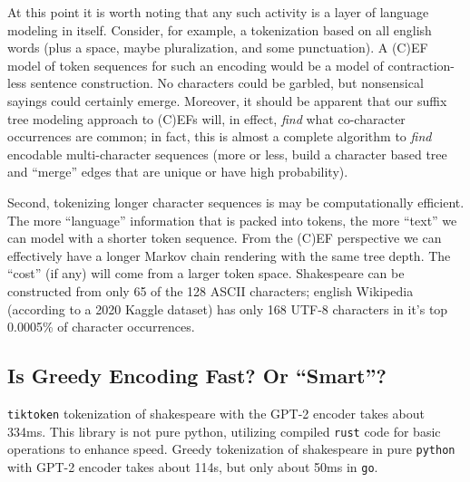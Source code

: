 \documentclass[11pt, oneside]{amsart}   	%
\begin{document}
At this point it is worth noting that any such activity is a layer of language modeling in itself. Consider, for example, a tokenization based on all english words (plus a space, maybe pluralization, and some punctuation). A (C)EF model of token sequences for such an encoding would be a model of contraction-less sentence construction. No characters could be garbled, but nonsensical sayings could certainly emerge. Moreover, it should be apparent that our suffix tree modeling approach to (C)EFs will, in effect, {\em find} what co-character occurrences are common; in fact, this is almost a complete algorithm to {\em find} encodable multi-character sequences (more or less, build a character based tree and ``merge'' edges that are unique or have high probability). 

Second, tokenizing longer character sequences is may be computationally efficient. The more ``language'' information that is packed into tokens, the more ``text'' we can model with a shorter token sequence. From the (C)EF perspective we can effectively have a longer Markov chain rendering with the same tree depth. The ``cost'' (if any) will come from a larger token space. Shakespeare can be constructed from only 65 of the 128 ASCII characters; english Wikipedia (according to a 2020 Kaggle dataset) has only 168 UTF-8 characters in it's top 0.0005\% of character occurrences. 

\subsection{Is Greedy Encoding Fast? Or ``Smart''?}

\texttt{tiktoken} tokenization of shakespeare with the GPT-2 encoder takes about 334ms. This library is not pure python, utilizing compiled \texttt{rust} code for basic operations to enhance speed. Greedy tokenization of shakespeare in pure \texttt{python} with GPT-2 encoder takes about 114s, but only about 50ms in \texttt{go}. 
\end{document}

